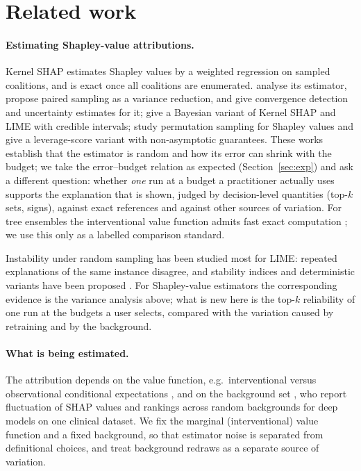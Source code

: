 \section{Related work}
\label{sec:related}
\paragraph{Estimating Shapley-value attributions.}
Kernel SHAP \citep{lundberg2017unified} estimates Shapley values by a weighted regression on sampled coalitions, and is exact once all coalitions are enumerated.
\citet{covert2020improving} analyse its estimator, propose paired sampling as a variance reduction, and give convergence detection and uncertainty estimates for it; \citet{slack2020reliable} give a Bayesian variant of Kernel SHAP and LIME with credible intervals;
\citet{mitchell2021sampling} study permutation sampling for Shapley values and \citet{musco2024leverage} give a leverage-score variant with non-asymptotic guarantees.
These works establish that the estimator is random and how its error can shrink with the budget; we take the error--budget relation as expected (Section~\ref{sec:exp}) and ask a different question: whether \emph{one} run at a budget a practitioner actually uses supports the explanation that is shown, judged by decision-level quantities (top-$k$ sets, signs), against exact references and against other sources of variation.
For tree ensembles the interventional value function admits fast exact computation \citep{lundberg2019trees}; we use this only as a labelled comparison standard.

Instability under random sampling has been studied most for LIME: repeated explanations of the same instance disagree, and stability indices and deterministic variants have been proposed \citep{visani2022stability,zafar2021deterministic}. For Shapley-value estimators the corresponding evidence is the variance analysis above; what is new here is the top-$k$ reliability of one run at the budgets a user selects, compared with the variation caused by retraining and by the background.

\paragraph{What is being estimated.}
The attribution depends on the value function, e.g.\ interventional versus observational conditional expectations \citep{chen2020true}, and on the background set \citep{yuan2022background}, who report fluctuation of SHAP values and rankings across random backgrounds for deep models on one clinical dataset.
We fix the marginal (interventional) value function and a fixed background, so that estimator noise is separated from definitional choices, and treat background redraws as a separate source of variation.

